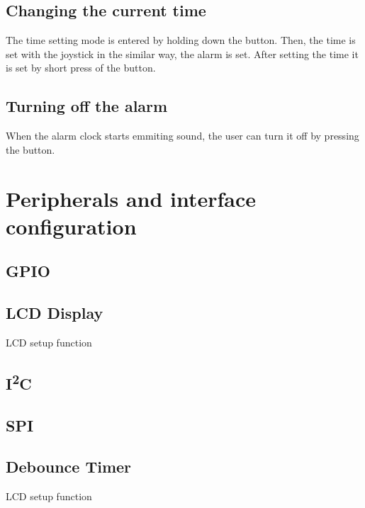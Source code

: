 \documentclass[10pt]{article}
\newcommand{\code}[3]{}
\begin{document}
    \subsection{Changing the current time}
    The time setting mode is entered by holding down the button.
    Then, the time is set with the joystick in the similar way, the alarm is set.
    After setting the time it is set by short press of the button.

    \subsection{Turning off the alarm}
    When the alarm clock starts emmiting sound, the user can turn it off by pressing the button.

    \section{Peripherals and interface configuration}
    
    \subsection{GPIO}
    
    \subsection{LCD Display}
    \begin{program}[H]
        \code{63}{96}{display.h}
        \caption{LCD setup function}
    \end{program}

    \subsection{I\textsuperscript{2}C}

    \subsection{SPI}

    \subsection{Debounce Timer}
    \begin{program}[H]
        \code{11}{19}{timer.h}
        \caption{LCD setup function}
    \end{program}
\end{document}
